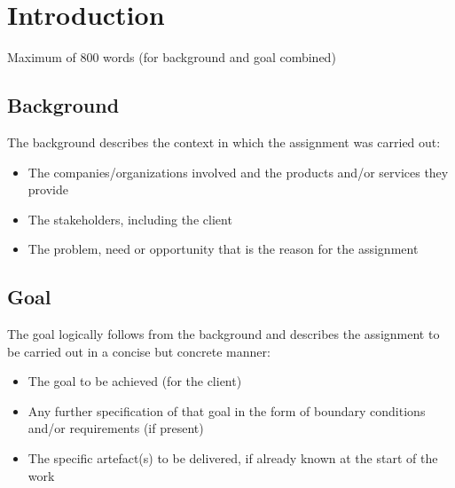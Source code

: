 \section{Introduction}

Maximum of 800 words (for background and goal combined)

\subsection{Background}
The background describes the context in which the assignment was carried out:
\begin{itemize}
    \item The companies/organizations involved and the products and/or services they provide
    \item The stakeholders, including the client
    \item The problem, need or opportunity that is the reason for the assignment
\end{itemize}

\subsection{Goal}
The goal logically follows from the background and describes the assignment to be carried out in a concise but concrete manner:
\begin{itemize}
    \item The goal to be achieved (for the client)
    \item Any further specification of that goal in the form of boundary conditions and/or requirements (if present)
    \item The specific artefact(s) to be delivered, if already known at the start of the work
\end{itemize}
